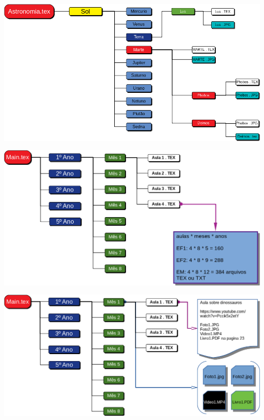 \begin{center}
	\includegraphics[height=\textheight]{./IMG-GIT/SVG/DIAGRAMAS4.png}
\end{center}
\pagebreak

\begin{center}
	\includegraphics[height=\textheight]{./IMG-GIT/SVG/DIAGRAMAS5.png}
\end{center}
\pagebreak

\begin{center}
	\includegraphics[width=\linewidth]{./IMG-GIT/SVG/DIAGRAMAS6.png}
\end{center}
\pagebreak


